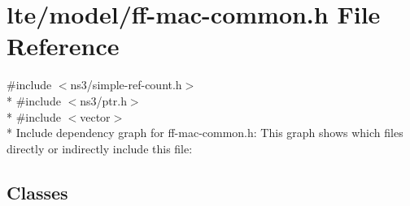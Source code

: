 \hypertarget{ff-mac-common_8h}{}\section{lte/model/ff-\/mac-\/common.h File Reference}
\label{ff-mac-common_8h}
{\ttfamily \#include $<$ns3/simple-\/ref-\/count.\+h$>$}\\*
{\ttfamily \#include $<$ns3/ptr.\+h$>$}\\*
{\ttfamily \#include $<$vector$>$}\\*
Include dependency graph for ff-\/mac-\/common.h\+:
This graph shows which files directly or indirectly include this file\+:
\subsection*{Classes}

